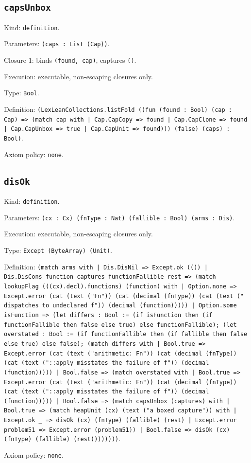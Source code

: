 \documentclass[11pt]{article}
\begin{document}
\subsection*{\texttt{capsUnbox}}
\noindent Kind: \texttt{definition}.\par
\noindent Parameters: \texttt{(caps : List (Cap))}.\par
\noindent Closure 1: binds \texttt{(found, cap)}, captures \texttt{()}.\par
\noindent Execution: executable, non-escaping closures only.\par
\noindent Type: \texttt{Bool}.\par
\noindent Definition: \texttt{(LexLeanCollections.listFold ((fun (found : Bool) (cap : Cap) => (match cap with | Cap.CapCopy => found | Cap.CapClone => found | Cap.CapUnbox => true | Cap.CapUnit => found))) (false) (caps) : Bool)}.\par
\noindent Axiom policy: \texttt{none}.\par
\subsection*{\texttt{disOk}}
\noindent Kind: \texttt{definition}.\par
\noindent Parameters: \texttt{(cx : Cx) (fnType : Nat) (fallible : Bool) (arms : Dis)}.\par
\noindent Execution: executable, non-escaping closures only.\par
\noindent Type: \texttt{Except (ByteArray) (Unit)}.\par
\noindent Definition: \texttt{(match arms with | Dis.DisNil => Except.ok (()) | Dis.DisCons function captures functionFallible rest => (match lookupFlag (((cx).decl).functions) (function) with | Option.none => Except.error (cat (text ("Fn")) (cat (decimal (fnType)) (cat (text (" dispatches to undeclared f")) (decimal (function))))) | Option.some isFunction => (let differs : Bool := (if isFunction then (if functionFallible then false else true) else functionFallible); (let overstated : Bool := (if functionFallible then (if fallible then false else true) else false); (match differs with | Bool.true => Except.error (cat (text ("arithmetic: Fn")) (cat (decimal (fnType)) (cat (text ("::apply misstates the failure of f")) (decimal (function))))) | Bool.false => (match overstated with | Bool.true => Except.error (cat (text ("arithmetic: Fn")) (cat (decimal (fnType)) (cat (text ("::apply misstates the failure of f")) (decimal (function))))) | Bool.false => (match capsUnbox (captures) with | Bool.true => (match heapUnit (cx) (text ("a boxed capture")) with | Except.ok \_ => disOk (cx) (fnType) (fallible) (rest) | Except.error problem51 => Except.error (problem51)) | Bool.false => disOk (cx) (fnType) (fallible) (rest))))))))}.\par
\noindent Axiom policy: \texttt{none}.\par
\end{document}

